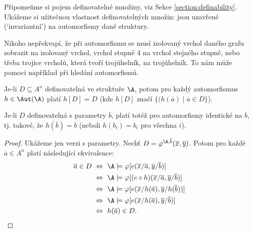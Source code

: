 Připomeňme si pojem definovatelné množiny, viz Sekce \ref{section:definability}. Ukážeme si užitečnou vlastnost definovatelných množin: jsou uzavřené (`invariantní') na automorfismy dané struktury. 

Nikoho nepřekvapí, že při automorfismu se musí izolovaný vrchol daného grafu zobrazit na izolovaný vrchol, vrchol stupně 4 na vrchol stejného stupně, nebo třeba trojice vrcholů, která tvoří trojúhelník, na trojúhelník. To nám může pomoci například při hledání automorfismů.

\begin{proposition}
    Je-li $D\subseteq A^n$ definovatelná ve struktuře $\A$, potom pro každý automorfismus $h\in\Aut(\A)$ platí $h[D]=D$ (kde $h[D]$ značí $\{(h(\overline{a})\mid\overline{a}\in D\}$).

    Je-li $D$ definovatelná s parametry $\overline{b}$, platí totéž pro automorfismy identické na $\overline{b}$, tj. takové, že $h(\overline{b})=\overline{b}$ (neboli $h(b_i)=b_i$ pro všechna $i$).
\end{proposition}
\begin{proof}
    Ukážeme jen verzi s parametry. Nechť $D=\varphi^{\A,\overline{b}}(\overline{x},\overline{y})$. Potom pro každé $\overline{a}\in A^n$ platí následující ekvivalence:
\begin{align*}
\overline{a}\in D\ 
&\Leftrightarrow\ \A\models \varphi[e(\overline{x}/\overline{a},\overline{y}/\overline{b})]\\
&\Leftrightarrow\  \A\models \varphi[(e\circ h)(\overline{x}/\overline{a},\overline{y}/\overline{b})]\\
&\Leftrightarrow\ \A\models \varphi[e(\overline{x}/h(\overline{a}),\overline{y}/h(\overline{b}))]\\
&\Leftrightarrow\ \A\models \varphi[e(\overline{x}/h(\overline{a}),\overline{y}/\overline{b})]\\
&\Leftrightarrow\ h(\overline{a})\in D.
\end{align*}
\end{proof}

